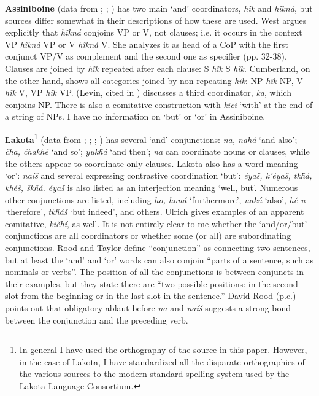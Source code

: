 \documentclass[output=paper]{LSP/langsci}
\begin{document}
\textbf{Assiniboine} (data from \citealt{West2003}; \citealt{Cumberland2005}; \citealt{Levin1964}) has two main `and' coordinators, \textit{h\~ik} and \textit{h\~ikná}, but sources differ somewhat in their descriptions of how these are used. West argues explicitly that \textit{h\~ikná} conjoins VP or V, not clauses; i.e. it occurs in the context VP \textit{h\~ikná} VP or V \textit{h\~ikná} V. She analyzes it as head of a CoP with the first conjunct VP/V as complement and the second one as specifier (pp. 32-38). Clauses are joined by \textit{h\~ik} repeated after each clause: S \textit{h\~ik} S \textit{h\~ik}. Cumberland, on the other hand, shows all categories joined by non-repeating \textit{h\~ik}: NP \textit{h\~ik} NP, V \textit{h\~ik} V, VP \textit{h\~ik} VP. (Levin, cited in \citealt[36]{Stassen2000}) discusses a third coordinator, \textit{ka}, which conjoins NP. There is also a comitative construction with \textit{kici} `with' at the end of a string of NPs. I have no information on `but' or `or' in Assiniboine.

\textbf{Lakota}\footnote{In general I have used the orthography of the source in this paper. However, in the case of Lakota, I have
standardized all the disparate orthographies of the various sources to the modern standard spelling system used by the Lakota Language Consortium.} (data from  \citealt{RoodTaylor1996}; \citealt{Ingham2002}; \citealt{Ullrich2016};  \citealt{BoasDeloria1941}) has several `and' conjunctions: \textit{na, nahá} `and also'; \textit{\v{c}ha, \v{c}hakhé} `and so'; \textit{yuk\v{h}á} `and then'; \textit{na} can coordinate nouns or clauses, while the others appear to coordinate only clauses. Lakota also has a word meaning `or': \textit{naí\v{s}} and several expressing contrastive coordination `but': \textit{éya\v{s}, k'éya\v{s}, tk\v{h}á, khé\v{s}, \v{s}k\v{h}á. éya\v{s}} is also listed as an interjection meaning `well, but'. Numerous other conjunctions are listed, including \textit{ho, honá} `furthermore', \textit{nakú} `also', \textit{hé u} `therefore', \textit{tk\v{h}á\v{s}} `but indeed', and others. Ulrich gives examples of an apparent comitative, \textit{ki\v{c}hí}, as well. It is not entirely clear to me whether the `and/or/but' conjunctions are all coordinators or whether some (or all) are subordinating conjunctions. Rood and Taylor define ``conjunction'' as connecting two sentences, but at least the `and' and `or' words can also conjoin ``parts of a sentence, such as nominals or verbs''. The position of all the conjunctions is between conjuncts in their examples, but they state there are ``two possible positions: in the second slot from the beginning or in the last slot in the sentence.'' David Rood (p.c.) points out that obligatory ablaut before \textit{na} and \textit{naí\v{s}} suggests a strong bond between the conjunction and the preceding verb.
\end{document}
